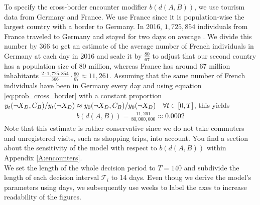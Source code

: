 To specify the cross-border encounter modifier $b(d(A,B))$, we use tourism data from Germany and France. We use France since it is population-wise the largest country with a border to Germany. In 2016, $1,725,854$ individuals from France traveled to Germany and stayed for two days on average \citep{SBA.2017}. We divide this number by 366 to get an estimate of the average number of French individuals in Germany at each day in 2016 and scale it by $\frac{80}{67}$ to adjust that our second country has a population size of 80 million, whereas France has around 67 million inhabitants $\frac{2 \cdot 1,725,854}{366} \cdot \frac{80}{67
} \approx 11,261$. Assuming that the same number of French individuals have been in Germany every day and using equation \eqref{eq:prob_cross_border} with a constant proportion $y_t(\neg X_D, C_B) / y_t(\neg X_D) \approx y_0(\neg X_D, C_B) / y_0(\neg X_D) \quad \forall t \in [0,T]$, this yields 
\begin{align*}
b(d(A, B)) = \frac{11,261}{80,000,000} \approx 0.0002
\end{align*}
Note that this estimate is rather conservative since we do not take commuters and unregistered visits, such as shopping trips, into account. You find a section about the sensitivity of the model with respect to $b(d(A, B))$ within Appendix \ref{A:encounters}. \\

We set the length of the whole decision period to $T=140$ and subdivide the length of each decision interval $\mathcal{T}_i$ to 14 days. Even thoug we derive the model's parameters using days, we subsequently use weeks to label the axes to increase readability of the figures.

